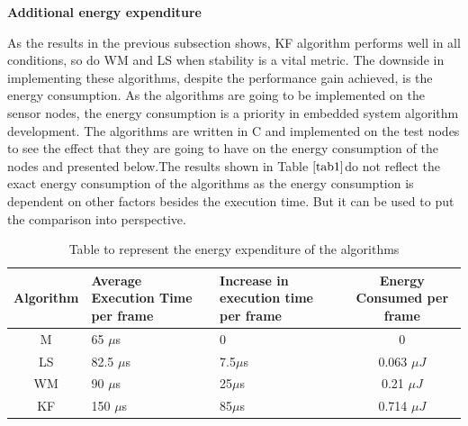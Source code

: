 \documentclass[a4paper,10pt]{report}
\begin{document}
\textbf{Additional energy expenditure}\par \noindent As the results
in the previous subsection shows, KF algorithm performs well in all
conditions, so do WM and LS when stability is a vital metric. The
downside in implementing these algorithms, despite the performance
gain achieved, is the energy consumption. As the algorithms are
going to be implemented on the sensor nodes, the energy consumption
is a priority in embedded system algorithm development. The
algorithms are written in C and implemented on the test nodes to see
the effect that they are going to have on the energy consumption of
the nodes and presented below.\newline The results shown in Table
$\ref{tab1}$do not reflect the exact energy consumption of the
algorithms as the energy consumption is dependent on other factors
besides the execution time. But it can be used to put the comparison
into perspective.
\begin{table}[!h]
    \caption{Table to represent the energy expenditure of the algorithms}
    \begin{tabular}{ |c | p{3.5cm} | p{3.5cm} |c | }
    \hline
    Algorithm & Average Execution Time per frame & Increase in execution time per frame & Energy Consumed per frame \\ \hline \hline
    M &  65 $\mu$s & 0 & 0  \\ \hline
    LS & 82.5 $\mu$s & 7.5$\mu$s & 0.063 $\mu J$  \\ \hline
    WM &   90 $\mu$s & 25$\mu$s & 0.21 $\mu J$ \\ \hline
    KF &  150 $\mu$s  & 85$\mu$s &  0.714 $\mu J$\\ \hline
    \end{tabular}
\label{tab1}
\end{table}
\end{document}

